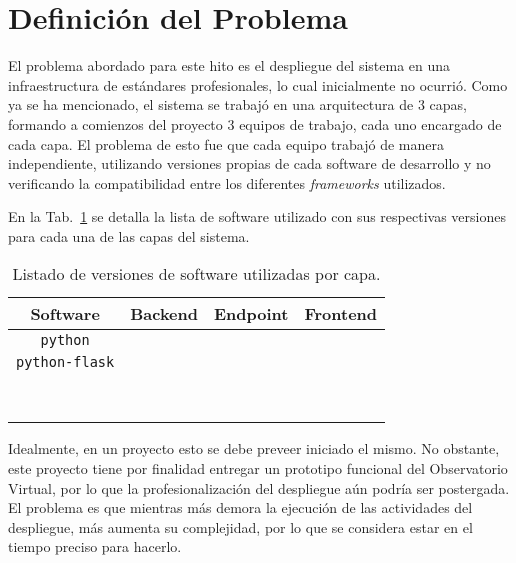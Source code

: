 \section{Definición del Problema}

El problema abordado para este hito es el despliegue del sistema en una infraestructura de estándares profesionales, lo cual inicialmente no ocurrió. Como ya se ha mencionado, el sistema se trabajó en una arquitectura de 3 capas, formando a comienzos del proyecto 3 equipos de trabajo, cada uno encargado de cada capa. El problema de esto fue que cada equipo trabajó de manera independiente, utilizando versiones propias de cada software de desarrollo y no verificando la compatibilidad entre los diferentes \emph{frameworks} utilizados.

En la Tab.~\ref{tab:versiones} se detalla la lista de software utilizado con sus respectivas versiones para cada una de las capas del sistema.

\begin{table}[ht!]
	\begin{center}
		\begin{tabular}{c|c|c|c}
			Software & Backend & Endpoint & Frontend \\\hline\hline
			\texttt{python} &  &  &   \\\hline
			\texttt{python-flask} &  &  &   \\\hline
			\texttt{} &  &  &   \\\hline
			\texttt{} &  &  &   \\\hline
			\texttt{} &  &  &   \\\hline
			\texttt{} &  &  &   \\\hline
			\texttt{} &  &  &   \\\hline
			\texttt{} &  &  &   \\\hline
			\texttt{} &  &  &   \\\hline
			\texttt{} &  &  &   \\
		\end{tabular}
	\end{center}
	\caption{Listado de versiones de software utilizadas por capa.}\label{tab:versiones}
\end{table}

Idealmente, en un proyecto esto se debe preveer iniciado el mismo. No obstante, este proyecto tiene por finalidad entregar un prototipo funcional del Observatorio Virtual, por lo que la profesionalización del despliegue aún podría ser postergada. El problema es que mientras más demora la ejecución de las actividades del despliegue, más aumenta su complejidad, por lo que se considera estar en el tiempo preciso para hacerlo.

